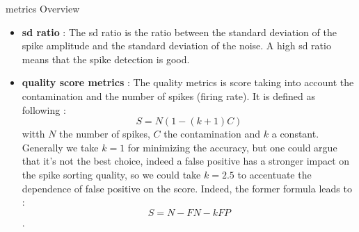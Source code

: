 \documentclass[numbering=fraction]{beamer}
\begin{document}
\begin{frame}{metrics Overview}
    \begin{itemize}

        \item \textbf{sd ratio} : The sd ratio is the ratio between the standard deviation of the spike amplitude and the standard deviation of the noise. A high sd ratio means that the spike detection is good.
        \item  \textbf{quality score metrics} :  The quality metrics is score taking into account the contamination and the number of spikes (firing rate). It is defined as following :
              $$S = N(1 - (k+1)C)$$ witth $N$ the number of spikes, $C$ the contamination and $k$ a constant. Generally we take $k = 1$ for minimizing the accuracy, but one could argue that it's not the best choice, indeed a false positive has a stronger impact on the spike sorting quality,
              so we could take $k = 2.5$ to accentuate the dependence of false positive on the score. Indeed, the former formula leads to : $$S = N - FN - k FP$$.
    \end{itemize}
\end{frame}
\end{document}
